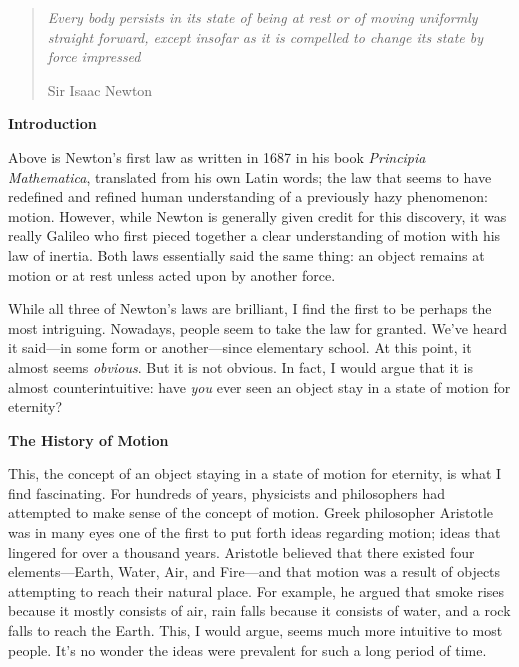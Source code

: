 
\noindent
\begin{quotation}
\textit{Every body persists in its state of being at rest or of moving uniformly straight forward, except insofar as it is compelled to change its state by force impressed}
\begin{flushright}
Sir Isaac Newton
\end{flushright}
\end{quotation}

\noindent
\textbf{Introduction}

Above is Newton’s first law as written in 1687 in his book \emph{Principia Mathematica}, translated from his own Latin words; the law that seems to have redefined and refined human understanding of a previously hazy phenomenon: motion. However, while Newton is generally given credit for this discovery, it was really Galileo who first pieced together a clear understanding of motion with his law of inertia. Both laws essentially said the same thing: an object remains at motion or at rest unless acted upon by another force.

While all three of Newton’s laws are brilliant, I find the first to be perhaps the most intriguing. Nowadays, people seem to take the law for granted. We’ve heard it said—in some form or another—since elementary school. At this point, it almost seems \emph{obvious}. But it is not obvious. In fact, I would argue that it is almost counterintuitive: have \emph{you} ever seen an object stay in a state of motion for eternity?

\noindent
\textbf{The History of Motion}

This, the concept of an object staying in a state of motion for eternity, is what I find fascinating. For hundreds of years, physicists and philosophers had attempted to make sense of the concept of motion. Greek philosopher Aristotle was in many eyes one of the first to put forth ideas regarding motion; ideas that lingered for over a thousand years. Aristotle believed that there existed four elements—Earth, Water, Air, and Fire—and that motion was a result of objects attempting to reach their natural place. For example, he argued that smoke rises because it mostly consists of air, rain falls because it consists of water, and a rock falls to reach the Earth. This, I would argue, seems much more intuitive to most people. It’s no wonder the ideas were prevalent for such a long period of time.

